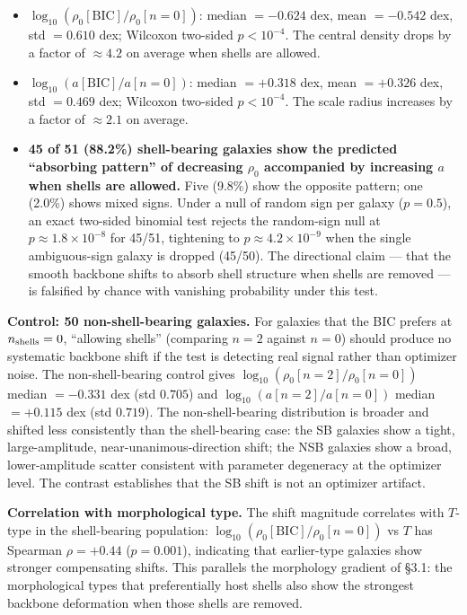 \documentclass[linenumbers,trackchanges]{aastex701}
\begin{document}
\begin{itemize}
  \item $\log_{10}(\rho_0[\text{BIC}] / \rho_0[n=0])$: median $= -0.624$ dex, mean $= -0.542$ dex, std $= 0.610$ dex; Wilcoxon two-sided $p < 10^{-4}$. The central density drops by a factor of $\approx 4.2$ on average when shells are allowed.
  \item $\log_{10}(a[\text{BIC}] / a[n=0])$: median $= +0.318$ dex, mean $= +0.326$ dex, std $= 0.469$ dex; Wilcoxon two-sided $p < 10^{-4}$. The scale radius increases by a factor of $\approx 2.1$ on average.
  \item \textbf{45 of 51 (88.2\%) shell-bearing galaxies show the predicted ``absorbing pattern'' of decreasing $\rho_0$ accompanied by increasing $a$ when shells are allowed.} Five (9.8\%) show the opposite pattern; one (2.0\%) shows mixed signs. Under a null of random sign per galaxy ($p = 0.5$), an exact two-sided binomial test rejects the random-sign null at $p \approx 1.8 \times 10^{-8}$ for 45/51, tightening to $p \approx 4.2 \times 10^{-9}$ when the single ambiguous-sign galaxy is dropped (45/50). The directional claim --- that the smooth backbone shifts to absorb shell structure when shells are removed --- is falsified by chance with vanishing probability under this test.
\end{itemize}

\textbf{Control: 50 non-shell-bearing galaxies.} For galaxies that the BIC prefers at $n_{\rm shells} = 0$, ``allowing shells'' (comparing $n = 2$ against $n = 0$) should produce no systematic backbone shift if the test is detecting real signal rather than optimizer noise. The non-shell-bearing control gives $\log_{10}(\rho_0[n=2]/\rho_0[n=0])$ median $= -0.331$ dex (std $0.705$) and $\log_{10}(a[n=2]/a[n=0])$ median $= +0.115$ dex (std $0.719$). The non-shell-bearing distribution is broader and shifted less consistently than the shell-bearing case: the SB galaxies show a tight, large-amplitude, near-unanimous-direction shift; the NSB galaxies show a broad, lower-amplitude scatter consistent with parameter degeneracy at the optimizer level. The contrast establishes that the SB shift is not an optimizer artifact.

\textbf{Correlation with morphological type.} The shift magnitude correlates with $T$-type in the shell-bearing population: $\log_{10}(\rho_0[\text{BIC}]/\rho_0[n=0])$ vs $T$ has Spearman $\rho = +0.44$ ($p = 0.001$), indicating that earlier-type galaxies show stronger compensating shifts. This parallels the morphology gradient of \S3.1: the morphological types that preferentially host shells also show the strongest backbone deformation when those shells are removed.
\end{document}
